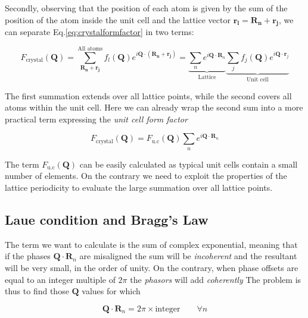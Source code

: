 Secondly, observing that the position of each atom is given by the sum of the position of the atom inside the unit cell 
and the lattice vector $\mathbf{r_l} = \mathbf{R_n} + \mathbf{r_j}$, we can separate Eq.\ref{eq:crystalformfactor} in two terms: 

\begin{equation}
    F_{\text{crystal}}(\mathbf{Q}) = 
   \sum_{\mathbf{R_n} + \mathbf{r_j}}^{\text{All atoms}} f_l(\mathbf Q) e^{i \mathbf{Q} \cdot (\mathbf{R_n} + \mathbf{r_j})} = 
    \underbrace{\sum_{n} e^{i \mathbf{Q} \cdot \mathbf{R}_n}}_{\text{Lattice}}
    \underbrace{\sum_{j} f_j(\mathbf{Q}) e^{i \mathbf{Q} \cdot \mathbf{r}_j}}_{\text{Unit cell}}
   \label{eq:crystalformfactor2}
\end{equation} 

The first summation extends over all lattice points, while the second covers all atoms within the unit cell. 
Here we can already wrap the second sum into a more practical term expressing the \textit{unit cell form factor} 

\begin{equation}
    F_{\text{crystal}}(\mathbf{Q}) =  F_{\text{u.c}}(\mathbf{Q}) \sum_{n} e^{i \mathbf{Q} \cdot \mathbf{R}_n}
   \label{eq:crystalformfactor3}
\end{equation}

The term $ F_{\text{u.c}}(\mathbf{Q}) $ can be easily calculated as typical unit cells contain a small number of elements.
On the contrary we need to exploit the properties of the lattice periodicity to evaluate the large summation over all lattice 
points. 


\subsection{Laue condition and Bragg's Law} 

The term we want to calculate is the sum of complex exponential, meaning that if the phases $\mathbf{Q} \cdot \mathbf{R}_n$ 
are misaligned the sum will be \textit{incoherent} and the resultant will be very small, in the order of unity. 
On the contrary, when phase offsets are equal to an integer multiple of $2\pi$ the \textit{phasors} will add \textit{coherently} 
The problem is thus to find those $\mathbf{Q}$ values for which

\begin{equation}
   \mathbf{Q} \cdot \mathbf{R}_n = 2\pi \times \text{integer}  \qquad \forall n
   \label{eq:laue}
\end{equation}

